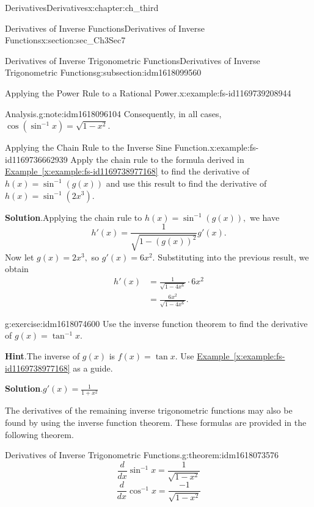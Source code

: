 \documentclass[oneside,10pt,]{book}
\newcommand{\blocktitlefont}{\relax}
\newcommand{\xreffont}{\relax}
\numberwithin{equation}{section}
\newcommand{\amp}{&}
\begin{document}
\begin{chapterptx}{Derivatives}{}{Derivatives}{}{}{x:chapter:ch_third}
\begin{sectionptx}{Derivatives of Inverse Functions}{}{Derivatives of Inverse Functions}{}{}{x:section:sec_Ch3Sec7}
\begin{subsectionptx}{Derivatives of Inverse Trigonometric Functions}{}{Derivatives of Inverse Trigonometric Functions}{}{}{g:subsection:idm1618099560}
\begin{example}{Applying the Power Rule to a Rational Power.}{x:example:fs-id1169739208944}
\begin{note}{Analysis.}{g:note:idm1618096104}
Consequently, in all cases, \(\cos  (\sin^{-1}x)=\sqrt{1-x^2}.\)%
\end{note}
\end{example}
\begin{example}{Applying the Chain Rule to the Inverse Sine Function.}{x:example:fs-id1169736662939}%
Apply the chain rule to the formula derived in \hyperref[x:example:fs-id1169738977168]{Example~{\xreffont\ref{x:example:fs-id1169738977168}}} to find the derivative of \(h(x)=\sin^{-1}(g(x))\) and use this result to find the derivative of \(h(x)=\sin^{-1}(2x^3).\)%
\par\smallskip%
\noindent\textbf{\blocktitlefont Solution}.\hypertarget{g:solution:idm1618078952}{}\quad{}Applying the chain rule to \(h(x)=\sin^{-1}(g(x)),\) we have%
%
\begin{equation*}
h'(x)=\frac{1}{\sqrt{1-(g(x))^2}}g'(x).
\end{equation*}
Now let \(g(x)=2x^3,\) so \(g'(x)=6x^2.\) Substituting into the previous result, we obtain%
%
\begin{align*}
h'(x)\amp=\frac{1}{\sqrt{1-4x^6}}\cdot 6x^2\\
\amp=\frac{6x^2}{\sqrt{1-4x^6}}.
\end{align*}
\end{example}
\begin{inlineexercise}{}{g:exercise:idm1618074600}%
Use the inverse function theorem to find the derivative of \(g(x)=\tan^{-1}x.\)%
\par\smallskip%
\noindent\textbf{\blocktitlefont Hint}.\hypertarget{g:hint:idm1618075112}{}\quad{}The inverse of \(g(x)\) is \(f(x)=\tan x.\) Use \hyperref[x:example:fs-id1169738977168]{Example~{\xreffont\ref{x:example:fs-id1169738977168}}} as a guide.%
\par\smallskip%
\noindent\textbf{\blocktitlefont Solution}.\hypertarget{g:solution:idm1618072680}{}\quad{}\(g'(x)=\frac{1}{1+x^2}\)%
\end{inlineexercise}%
The derivatives of the remaining inverse trigonometric functions may also be found by using the inverse function theorem. These formulas are provided in the following theorem.%
\begin{theorem}{Derivatives of Inverse Trigonometric Functions.}{}{g:theorem:idm1618073576}%
%
\begin{equation}
\frac{d}{dx} \sin^{-1}x=\frac{1}{\sqrt{1-x^2}}\label{g:men:idm1618073704}
\end{equation}
%
\begin{equation}
\frac{d}{dx} \cos^{-1}x=\frac{-1}{\sqrt{1-x^2}}\label{x:men:fs-id1169736659297}

\end{equation}
\end{theorem}
\end{subsectionptx}
\end{sectionptx}
\end{chapterptx}
\end{document}
